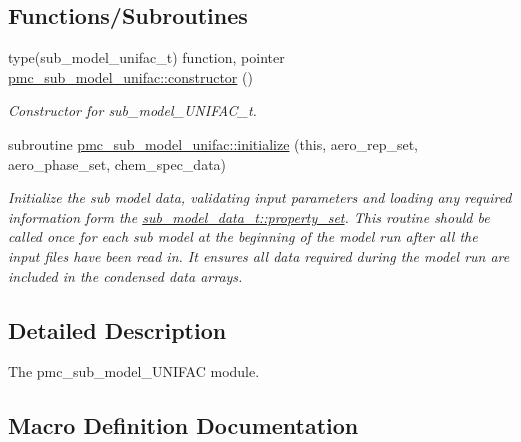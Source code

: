 \subsection*{Functions/\+Subroutines}
\begin{DoxyCompactItemize}
\item 
type(sub\+\_\+model\+\_\+unifac\+\_\+t) function, pointer \mbox{\hyperlink{namespacepmc__sub__model__unifac_a7fec1fd7bbc74086fab284260f53b3aa}{pmc\+\_\+sub\+\_\+model\+\_\+unifac\+::constructor}} ()
\begin{DoxyCompactList}\small\item\em Constructor for sub\+\_\+model\+\_\+\+U\+N\+I\+F\+A\+C\+\_\+t. \end{DoxyCompactList}\item 
subroutine \mbox{\hyperlink{namespacepmc__sub__model__unifac_ae9201c599c1dd41196467fc292445b20}{pmc\+\_\+sub\+\_\+model\+\_\+unifac\+::initialize}} (this, aero\+\_\+rep\+\_\+set, aero\+\_\+phase\+\_\+set, chem\+\_\+spec\+\_\+data)
\begin{DoxyCompactList}\small\item\em Initialize the sub model data, validating input parameters and loading any required information form the {\ttfamily \mbox{\hyperlink{structpmc__sub__model__data_1_1sub__model__data__t_aeb00155797966fc95e75ad14d45e7242}{sub\+\_\+model\+\_\+data\+\_\+t\+::property\+\_\+set}}}. This routine should be called once for each sub model at the beginning of the model run after all the input files have been read in. It ensures all data required during the model run are included in the condensed data arrays. \end{DoxyCompactList}\end{DoxyCompactItemize}


\subsection{Detailed Description}
The pmc\+\_\+sub\+\_\+model\+\_\+\+U\+N\+I\+F\+AC module. 



\subsection{Macro Definition Documentation}
\mbox{\label{sub__model___u_n_i_f_a_c_8_f90_a8d05b7ab46c7539147c2f20cdd779123}} 
